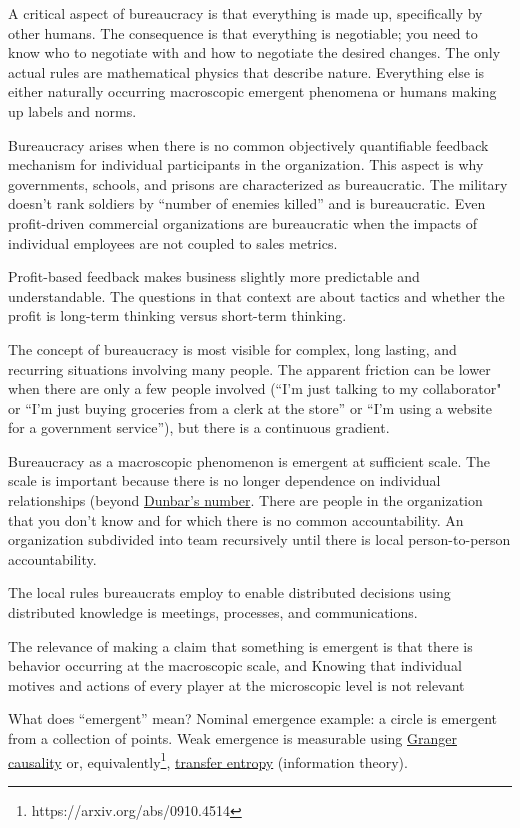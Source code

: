 A critical aspect of bureaucracy is that everything is made up, specifically by other humans. The consequence is that everything is negotiable; you need to know who to negotiate with and how to negotiate the desired changes. The only actual rules are mathematical physics that describe nature. Everything else is either naturally occurring macroscopic emergent phenomena or humans making up labels and norms. 

Bureaucracy arises when there is no common objectively quantifiable feedback mechanism for individual participants in the organization. This aspect is why governments, schools, and prisons are characterized as bureaucratic. The military doesn't rank soldiers by ``number of enemies killed'' and is bureaucratic. Even profit-driven commercial organizations are bureaucratic when the impacts of individual employees are not coupled to sales metrics. 

Profit-based feedback makes business slightly more predictable and understandable. The questions in that context are about tactics and whether the profit is long-term thinking versus short-term thinking. 

The concept of bureaucracy is most visible for complex, long lasting, and recurring situations involving many people. The apparent friction can be lower when there are only a few people involved (``I'm just talking to my collaborator" or ``I'm just buying groceries from a clerk at the store'' or ``I'm using a website for a government service''), but there is a continuous gradient. 

Bureaucracy as a macroscopic phenomenon is emergent at sufficient scale. The scale is important because there is no longer dependence on individual relationships (beyond \href{https://en.wikipedia.org/wiki/Dunbar\%27s_number}{Dunbar's number}. There are people in the organization that you don't know and for which there is no common accountability. An organization subdivided into team recursively until there is local person-to-person accountability.  

The local rules bureaucrats employ to enable distributed decisions using distributed knowledge is meetings, processes, and communications. 

The relevance of making a claim that something is emergent is that there is behavior occurring at the macroscopic scale, and Knowing that individual motives and actions of every player at the microscopic level is not relevant

What does ``emergent'' mean? Nominal emergence example: a circle is emergent from a collection of points. Weak emergence is measurable using \href{https://en.wikipedia.org/wiki/Granger_causality}{Granger causality} or, equivalently\footnote{https://arxiv.org/abs/0910.4514}, \href{https://en.wikipedia.org/wiki/Transfer_entropy}{transfer entropy} (information theory). 

